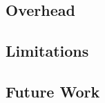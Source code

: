 \placeholder

\subsection{Overhead}
\placeholder

\subsection{Limitations}
\placeholder

\subsection{Future Work}
\placeholder